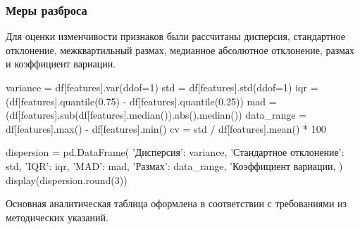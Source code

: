 \subsubsection*{Меры разброса}
 
Для оценки изменчивости признаков были рассчитаны дисперсия, стандартное отклонение, межквартильный размах, медианное абсолютное отклонение, размах и коэффициент вариации.
 
\begin{Code}
variance = df[features].var(ddof=1)
std = df[features].std(ddof=1)
iqr = (df[features].quantile(0.75) - df[features].quantile(0.25))
mad = (df[features].sub(df[features].median()).abs().median())
data_range = df[features].max() - df[features].min()
cv = std / df[features].mean() * 100

dispersion = pd.DataFrame({
	'Дисперсия': variance,
	'Стандартное отклонение': std,
	'IQR': iqr,
	'MAD': mad,
	'Размах': data_range,
	'Коэффициент вариации, %
})
display(dispersion.round(3))
\end{Code}
 
Основная аналитическая таблица оформлена в соответствии с требованиями
из методических указаний.
 

